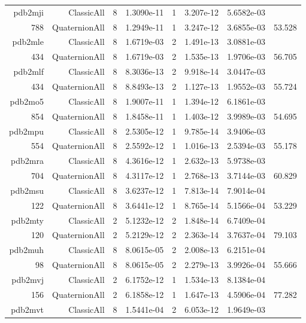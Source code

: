 \begin{xltabular}{\textwidth}{r|rcS[table-format=1.4e+2]cS[table-format=1.3e+2]S[table-format=1.4e+2]S[table-format=-1.3]}
pdb2mji & ClassicAll & 8 & 1.3090e-11 & 1 & 3.207e-12 & 5.6582e-03 & \\
788 & QuaternionAll & 8 & 1.2949e-11 & 1 & 3.247e-12 & 3.6855e-03 & 53.528\\  \addlinespace
pdb2mle & ClassicAll & 8 & 1.6719e-03 & 2 & 1.491e-13 & 3.0881e-03 & \\
434 & QuaternionAll & 8 & 1.6719e-03 & 2 & 1.535e-13 & 1.9706e-03 & 56.705\\  \addlinespace
pdb2mlf & ClassicAll & 8 & 8.3036e-13 & 2 & 9.918e-14 & 3.0447e-03 & \\
434 & QuaternionAll & 8 & 8.8493e-13 & 2 & 1.127e-13 & 1.9552e-03 & 55.724\\  \addlinespace
pdb2mo5 & ClassicAll & 8 & 1.9007e-11 & 1 & 1.394e-12 & 6.1861e-03 & \\
854 & QuaternionAll & 8 & 1.8458e-11 & 1 & 1.403e-12 & 3.9989e-03 & 54.695\\  \addlinespace
pdb2mpu & ClassicAll & 8 & 2.5305e-12 & 1 & 9.785e-14 & 3.9406e-03 & \\
554 & QuaternionAll & 8 & 2.5592e-12 & 1 & 1.016e-13 & 2.5394e-03 & 55.178\\  \addlinespace
pdb2mra & ClassicAll & 8 & 4.3616e-12 & 1 & 2.632e-13 & 5.9738e-03 & \\
704 & QuaternionAll & 8 & 4.3117e-12 & 1 & 2.768e-13 & 3.7144e-03 & 60.829\\  \addlinespace
pdb2msu & ClassicAll & 8 & 3.6237e-12 & 1 & 7.813e-14 & 7.9014e-04 & \\
122 & QuaternionAll & 8 & 3.6441e-12 & 1 & 8.765e-14 & 5.1566e-04 & 53.229\\  \addlinespace
pdb2mty & ClassicAll & 2 & 5.1232e-12 & 2 & 1.848e-14 & 6.7409e-04 & \\
120 & QuaternionAll & 2 & 5.2129e-12 & 2 & 2.363e-14 & 3.7637e-04 & 79.103\\  \addlinespace
pdb2muh & ClassicAll & 8 & 8.0615e-05 & 2 & 2.008e-13 & 6.2151e-04 & \\
98 & QuaternionAll & 8 & 8.0615e-05 & 2 & 2.279e-13 & 3.9926e-04 & 55.666\\  \addlinespace
pdb2mvj & ClassicAll & 2 & 6.1752e-12 & 1 & 1.534e-13 & 8.1384e-04 & \\
156 & QuaternionAll & 2 & 6.1858e-12 & 1 & 1.647e-13 & 4.5906e-04 & 77.282\\  \addlinespace
pdb2mvt & ClassicAll & 8 & 1.5441e-04 & 2 & 6.053e-12 & 1.9649e-03 & \\

\end{xltabular}
